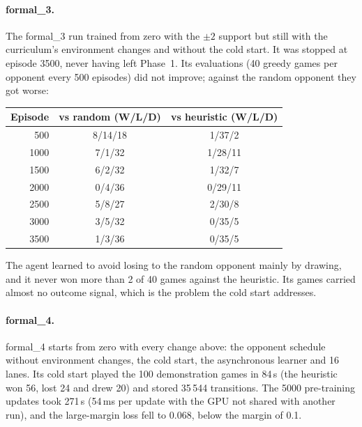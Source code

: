 \paragraph{formal\_3.} The formal\_3 run trained from zero with the $\pm 2$ support but still
with the curriculum's environment changes and without the cold start. It was stopped at episode
3500, never having left Phase~1. Its evaluations (40 greedy games per opponent every 500
episodes) did not improve; against the random opponent they got worse:
\begin{center}
\begin{tabular}{rcc}
\toprule
Episode & vs random (W/L/D) & vs heuristic (W/L/D) \\
\midrule
500  & 8/14/18 & 1/37/2  \\
1000 & 7/1/32  & 1/28/11 \\
1500 & 6/2/32  & 1/32/7  \\
2000 & 0/4/36  & 0/29/11 \\
2500 & 5/8/27  & 2/30/8  \\
3000 & 3/5/32  & 0/35/5  \\
3500 & 1/3/36  & 0/35/5  \\
\bottomrule
\end{tabular}
\end{center}
The agent learned to avoid losing to the random opponent mainly by drawing, and it never won
more than 2 of 40 games against the heuristic. Its games carried almost no outcome signal, which
is the problem the cold start addresses.

\paragraph{formal\_4.} formal\_4 starts from zero with every change above: the opponent schedule
without environment changes, the cold start, the asynchronous learner and 16 lanes. Its cold
start played the 100 demonstration games in 84\,s (the heuristic won 56, lost 24 and drew 20)
and stored 35\,544 transitions. The 5000 pre-training updates took 271\,s (54\,ms per update with
the GPU not shared with another run), and the large-margin loss fell to 0.068, below the margin
of 0.1.

